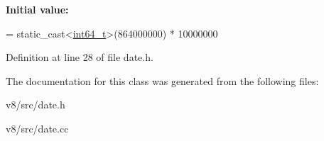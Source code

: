 {\bfseries Initial value\+:}
\begin{DoxyCode}
=
      \textcolor{keyword}{static\_cast<}\mbox{\hyperlink{classint64__t}{int64\_t}}\textcolor{keyword}{>}(864000000) * 10000000
\end{DoxyCode}


Definition at line 28 of file date.\+h.



The documentation for this class was generated from the following files\+:\begin{DoxyCompactItemize}
\item 
v8/src/date.\+h\item 
v8/src/date.\+cc\end{DoxyCompactItemize}

